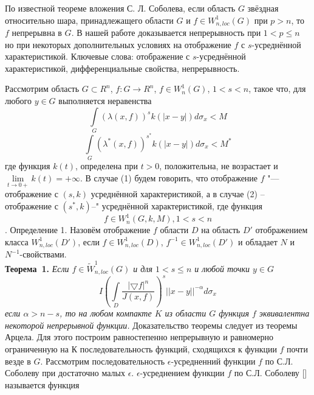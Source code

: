 \vzmscaption
По известной теореме вложения С. Л. Соболева, если область $G$ звёздная относительно шара, принадлежащего области $G$ и $f \in W^{1}_{n,loc}(G)$ при $p>n$, то $f$ непрерывна в $G$. В нашей работе доказывается непрерывность при $1<p\leq n$ но при некоторых дополнительных условиях на отображение $f$ с $s$-усреднённой характеристикой.
Ключевые слова: отображение с $s$-усреднённой характеристикой, дифференциальные свойства, непрерывность.

Рассмотрим область $G\subset R^n$, $f:G\to R^n$, $f\in W^{1}_{n}(G)$, $1<s<n$, такое что, для любого $y\in G$ выполняется неравенства
\begin{equation}
\int\limits_{G}(\lambda(x,f))^{s}k(|x-y|)d\sigma_{x}<M
\end{equation}
\begin{equation}
\int\limits_{G}(\lambda^{*}(x,f))^{s^{*}}k(|x-y|)d\sigma_{x}<M^{*}
\end{equation}
где функция $k(t)$, определена при $t>0$, положительна, не возрастает и $\lim\limits_{t\to 0+}k(t)=+\infty$. В случае (1) будем говорить, что отображение $f$ "--- отображение с $(s,k)$ усреднённой характеристикой, а в случае (2) – отображение с $(s^{*},k)$--" усреднённой характеристикой, где функция $$f\in W^{1}_{n}(G,k,M), 1<s<n$$.
Определение 1. Назовём отображение $f$ области $D$ на область $D'$ отображением класса $W^{1}_{n,loc}(D')$, если $f \in W^{1}_{n,loc}(D)$, $f^{-1} \in W^{1}_{n,loc}(D')$ и обладает $N$ и $N^{-1}$-свойствами.\\
\textbf{Теорема~1.} {\it Если $f\in\widetilde{W}_{n,loc}^1(G) $ и для $1<s\leq n$ и любой точки $y\in G$
\begin{equation}
I\left(
\int\limits_D\frac{|\bigtriangledown f|^{n}}{J(x,f)}
\right)^{s}||x-y||^{-\alpha}d\sigma_{x}
\end{equation}
если $\alpha>n-s$, то на любом компакте $K$ из области $G$ функция $f$ эквивалентна некоторой непрерывной функции.} Доказательство теоремы следует из теоремы Арцела. Для этого построим равностепенно непрерывную и равномерно ограниченную на $К$ последовательность функций, сходящихся к функции $f$ почти везде в $G$. Рассмотрим последовательность $\epsilon$-усредненний функции $f$ по С.Л. Соболеву при достаточно малых $\epsilon$. $\epsilon$-усреднением функции $f$ по С.Л. Соболеву [] называется функция
